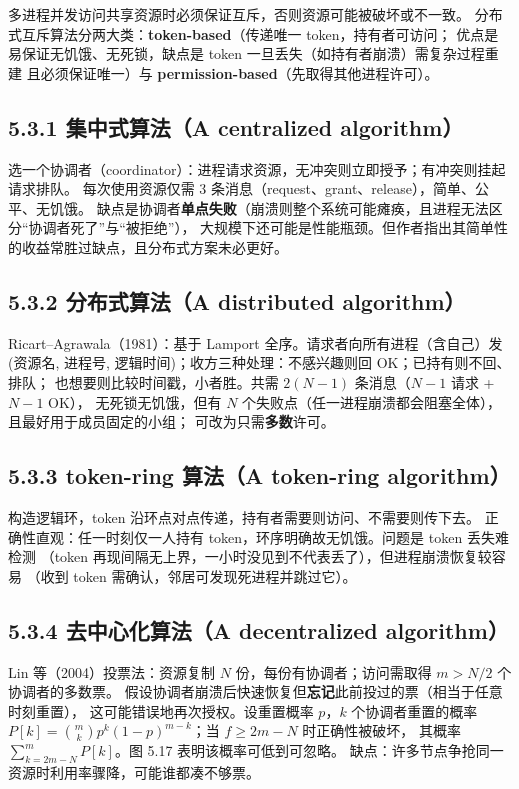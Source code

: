 

多进程并发访问共享资源时必须保证互斥，否则资源可能被破坏或不一致。
分布式互斥算法分两大类：\textbf{token-based}（传递唯一 token，持有者可访问；
优点是易保证无饥饿、无死锁，缺点是 token 一旦丢失（如持有者崩溃）需复杂过程重建
且必须保证唯一）与 \textbf{permission-based}（先取得其他进程许可）。

\subsection*{5.3.1 集中式算法（A centralized algorithm）}
选一个协调者（coordinator）：进程请求资源，无冲突则立即授予；有冲突则挂起请求排队。
每次使用资源仅需 3 条消息（request、grant、release），简单、公平、无饥饿。
缺点是协调者\textbf{单点失败}（崩溃则整个系统可能瘫痪，且进程无法区分“协调者死了”与“被拒绝”），
大规模下还可能是性能瓶颈。但作者指出其简单性的收益常胜过缺点，且分布式方案未必更好。

\subsection*{5.3.2 分布式算法（A distributed algorithm）}
Ricart--Agrawala（1981）：基于 Lamport 全序。请求者向所有进程（含自己）发
(资源名, 进程号, 逻辑时间)；收方三种处理：不感兴趣则回 OK；已持有则不回、排队；
也想要则比较时间戳，小者胜。共需 $2(N-1)$ 条消息（$N-1$ 请求 + $N-1$ OK），
无死锁无饥饿，但有 $N$ 个失败点（任一进程崩溃都会阻塞全体），且最好用于成员固定的小组；
可改为只需\textbf{多数}许可。

\subsection*{5.3.3 token-ring 算法（A token-ring algorithm）}
构造逻辑环，token 沿环点对点传递，持有者需要则访问、不需要则传下去。
正确性直观：任一时刻仅一人持有 token，环序明确故无饥饿。问题是 token 丢失难检测
（token 再现间隔无上界，一小时没见到不代表丢了），但进程崩溃恢复较容易
（收到 token 需确认，邻居可发现死进程并跳过它）。

\subsection*{5.3.4 去中心化算法（A decentralized algorithm）}
Lin 等（2004）投票法：资源复制 $N$ 份，每份有协调者；访问需取得 $m > N/2$ 个协调者的多数票。
假设协调者崩溃后快速恢复但\textbf{忘记}此前投过的票（相当于任意时刻重置），
这可能错误地再次授权。设重置概率 $p$，$k$ 个协调者重置的概率
$P[k] = \binom{m}{k} p^k (1-p)^{m-k}$；当 $f \ge 2m - N$ 时正确性被破坏，
其概率 $\sum_{k=2m-N}^{m} P[k]$。图 5.17 表明该概率可低到可忽略。
缺点：许多节点争抢同一资源时利用率骤降，可能谁都凑不够票。

